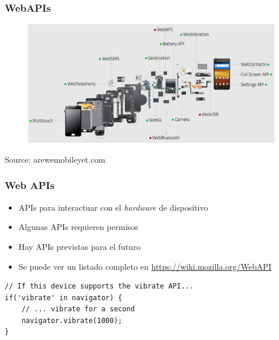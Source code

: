 
\begin{frame}
\frametitle{WebAPIs}

\begin{center}
\begin{figure}[p]
\includegraphics[width=0.99\textwidth]{figs/arewemobileyet.png}
\end{figure}
\end{center}

\begin{flushright}
{\tiny
Source: arewemobileyet.com
}
\end{flushright}

\end{frame}


\begin{frame}[fragile]
\frametitle{Web APIs}

\begin{itemize}
  \item APIs para interactuar con el \emph{hardware} de dispositivo
  \item Algunas APIs requieren permisos 
  \item Hay APIs previstas para el futuro
  \item Se puede ver un listado completo en \url{https://wiki.mozilla.org/WebAPI}
\end{itemize}

\begin{verbatim}
// If this device supports the vibrate API...
if('vibrate' in navigator) {
    // ... vibrate for a second
    navigator.vibrate(1000);
}
\end{verbatim}

\end{frame}



